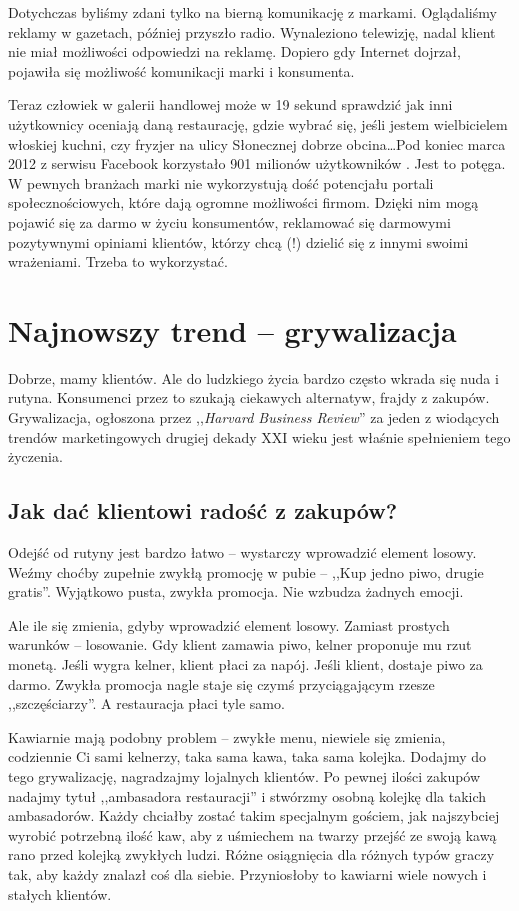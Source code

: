 \documentclass [a4paper, 11pt]{article}
\begin{document}
Dotychczas byliśmy zdani tylko na bierną komunikację z markami. Oglądaliśmy reklamy w gazetach, później przyszło radio. Wynaleziono telewizję, nadal klient nie miał możliwości odpowiedzi na reklamę. Dopiero gdy Internet dojrzał, pojawiła się możliwość komunikacji marki i konsumenta.

Teraz człowiek w galerii handlowej może w 19 sekund sprawdzić jak inni użytkownicy oceniają daną restaurację, gdzie wybrać się, jeśli jestem wielbicielem włoskiej kuchni, czy fryzjer na ulicy Słonecznej dobrze obcina\dots Pod koniec marca 2012 z serwisu Facebook korzystało 901 milionów użytkowników \cite{facebook}. Jest to potęga. W pewnych branżach marki nie wykorzystują dość potencjału portali społecznościowych, które dają ogromne możliwości firmom. Dzięki nim mogą pojawić się za darmo w życiu konsumentów, reklamować się darmowymi pozytywnymi opiniami klientów, którzy chcą (!) dzielić się z innymi swoimi wrażeniami. Trzeba to wykorzystać.
\section{Najnowszy trend -- grywalizacja}
Dobrze, mamy klientów. Ale do ludzkiego życia bardzo często wkrada się nuda i rutyna. Konsumenci przez to szukają ciekawych alternatyw, frajdy z zakupów. Grywalizacja, ogłoszona przez ,,\emph{Harvard Business Review}'' za jeden z wiodących trendów marketingowych drugiej dekady XXI wieku jest właśnie spełnieniem tego życzenia.\cite{tkaczykgrywalizacja}
\subsection{Jak dać klientowi radość z zakupów?}
Odejść od rutyny jest bardzo łatwo -- wystarczy wprowadzić element losowy. Weźmy choćby zupełnie zwykłą promocję w pubie -- ,,Kup jedno piwo, drugie gratis''. \cite{tkaczykwideo} Wyjątkowo pusta, zwykła promocja. Nie wzbudza żadnych emocji.

Ale ile się zmienia, gdyby wprowadzić element losowy. Zamiast prostych warunków -- losowanie. Gdy klient zamawia piwo, kelner proponuje mu rzut monetą. Jeśli wygra kelner, klient płaci za napój. Jeśli klient, dostaje piwo za darmo. Zwykła promocja nagle staje się czymś przyciągającym rzesze ,,szczęściarzy''. A restauracja płaci tyle samo.

Kawiarnie mają podobny problem -- zwykłe menu, niewiele się zmienia, codziennie Ci sami kelnerzy, taka sama kawa, taka sama kolejka. Dodajmy do tego grywalizację, nagradzajmy lojalnych klientów. Po pewnej ilości zakupów nadajmy tytuł ,,ambasadora restauracji'' i stwórzmy osobną kolejkę dla takich ambasadorów. Każdy chciałby zostać takim specjalnym gościem, jak najszybciej wyrobić potrzebną ilość kaw, aby z uśmiechem na twarzy przejść ze swoją kawą rano przed kolejką zwykłych ludzi. Różne osiągnięcia dla różnych typów graczy tak, aby każdy znalazł coś dla siebie. Przyniosłoby to kawiarni wiele nowych i stałych klientów.
\end{document}
